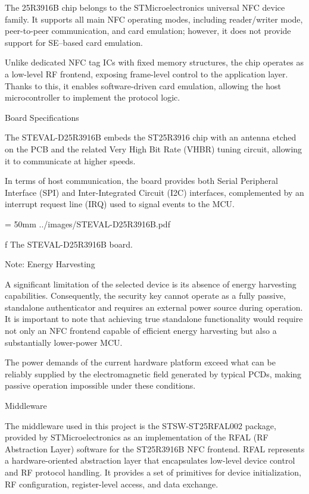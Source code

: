 \nl The 25R3916B chip belongs to the STMicroelectronics universal NFC device family. It supports all main NFC operating modes, including reader/writer mode, peer-to-peer communication, and card emulation; however, it does not provide support for SE–based card emulation.

\nl Unlike dedicated NFC tag ICs with fixed memory structures, the chip operates as a low-level RF frontend, exposing frame-level control to the application layer. Thanks to this, it enables software-driven card emulation, allowing the host microcontroller to implement the protocol logic.

 Board Specifications

The STEVAL-D25R3916B embeds the {\sbf ST25R3916 chip} with an antenna etched on the PCB and the related Very High Bit Rate (VHBR) tuning circuit, allowing it to communicate at higher speeds.

\nl In terms of host communication, the board provides both Serial Peripheral Interface (SPI) and Inter-Integrated Circuit (I2C) interfaces, complemented by an interrupt request line (IRQ) used to signal events to the MCU.

\midinsert
{}
\picheight = 50mm \cinspic ../images/STEVAL-D25R3916B.pdf
\caption /f The STEVAL-D25R3916B board.
\endinsert

 Note: Energy Harvesting

A significant limitation of the selected device is its absence of energy harvesting capabilities. Consequently, the security key cannot operate as a fully passive, standalone authenticator and requires an external power source during operation. It is important to note that achieving true standalone functionality would require not only an NFC frontend capable of efficient energy harvesting but also a substantially lower-power MCU. 

\nl The power demands of the current hardware platform exceed what can be reliably supplied by the electromagnetic field generated by typical PCDs, making passive operation impossible under these conditions.

\sec[middleware] Middleware

The middleware used in this project is the STSW-ST25RFAL002 package, provided by STMicroelectronics as an implementation of the RFAL (RF Abstraction Layer) software for the ST25R3916B NFC frontend. RFAL represents a hardware-oriented abstraction layer that encapsulates low-level device control and RF protocol handling. It provides a set of primitives for device initialization, RF configuration, register-level access, and data exchange.

